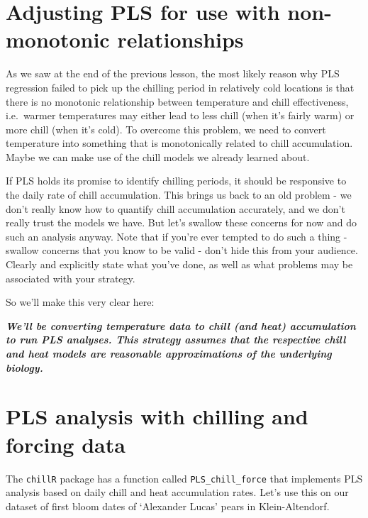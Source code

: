 \documentclass[
]{book}
\begin{document}
\hypertarget{adjusting-pls-for-use-with-non-monotonic-relationships}{%
\section{Adjusting PLS for use with non-monotonic relationships}\label{adjusting-pls-for-use-with-non-monotonic-relationships}}

As we saw at the end of the previous lesson, the most likely reason why PLS regression failed to pick up the chilling period in relatively cold locations is that there is no monotonic relationship between temperature and chill effectiveness, i.e.~warmer temperatures may either lead to less chill (when it's fairly warm) or more chill (when it's cold). To overcome this problem, we need to convert temperature into something that is monotonically related to chill accumulation. Maybe we can make use of the chill models we already learned about.

If PLS holds its promise to identify chilling periods, it should be responsive to the daily rate of chill accumulation. This brings us back to an old problem - we don't really know how to quantify chill accumulation accurately, and we don't really trust the models we have. But let's swallow these concerns for now and do such an analysis anyway. Note that if you're ever tempted to do such a thing - swallow concerns that you know to be valid - don't hide this from your audience. Clearly and explicitly state what you've done, as well as what problems may be associated with your strategy.

So we'll make this very clear here:

\textbf{\emph{We'll be converting temperature data to chill (and heat) accumulation to run PLS analyses. This strategy assumes that the respective chill and heat models are reasonable approximations of the underlying biology.}}

\hypertarget{pls-analysis-with-chilling-and-forcing-data}{%
\section{PLS analysis with chilling and forcing data}\label{pls-analysis-with-chilling-and-forcing-data}}

The \texttt{chillR} package has a function called \texttt{PLS\_chill\_force} that implements PLS analysis based on daily chill and heat accumulation rates. Let's use this on our dataset of first bloom dates of `Alexander Lucas' pears in Klein-Altendorf.
\end{document}
